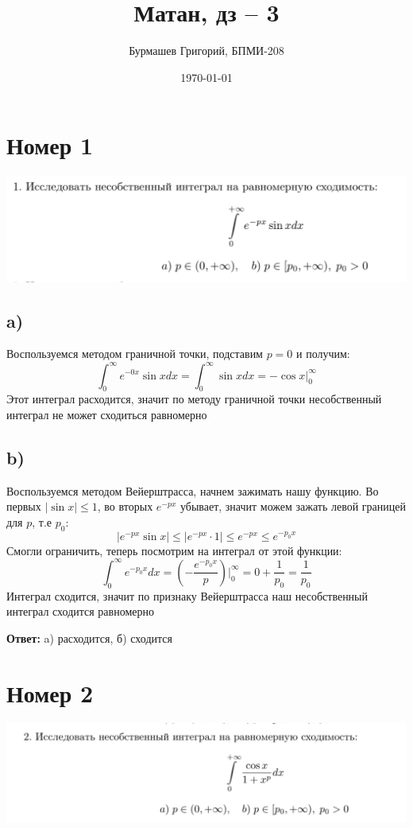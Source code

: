 \documentclass[a4paper,12pt]{article}
\author{Бурмашев Григорий, БПМИ-208}
\title{Матан, дз -- 3}
\date{\today}
\begin{document}
\maketitle
\clearpage

\section*{Номер 1}
\begin{center}
\includegraphics[scale=0.4]{1.png}
\end{center}
\subsection*{a)}
Воспользуемся методом граничной точки, подставим $p = 0$ и получим:
\[
\int_0^{\infty} e^{-0x} \sin x dx = \int_0^{\infty}  \sin x dx = - \cos x \Bigg|_0^{\infty} 
\]
Этот интеграл расходится, значит по методу граничной точки несобственный интеграл не может сходиться равномерно

\subsection*{b)}
Воспользуемся методом Вейерштрасса, начнем зажимать нашу функцию. Во первых $| \sin x | \leq 1$, во вторых $e^{-px}$ убывает, значит можем зажать левой границей для $p$, т.е $p_0$:
\[
\left|
e^{-px} \sin x 
\right|
 \leq 
\left|
e^{-px} \cdot 1
\right|
\leq 
e^{-px}
\leq 
e^{-p_0 x}
\]
Смогли ограничить, теперь посмотрим на интеграл от этой функции:
\[
\int_0^{\infty} e^{-p_0 x}  dx= 
\left(
-\frac{e^{-p_0 x}}{p}
\right)
\Bigg|_0^{\infty} 
= 
0 
+ \frac{1}{p_0} 
=
\frac{1}{p_0} 
\]
Интеграл сходится, значит по признаку Вейерштрасса наш несобственный интеграл сходится равномерно
\begin{center}
\textbf{Ответ:} a) расходится, б) сходится 
\end{center}
\clearpage
\section*{Номер 2}
\begin{center}
\includegraphics[scale=0.4]{2.png}
\end{center}
\end{document}
